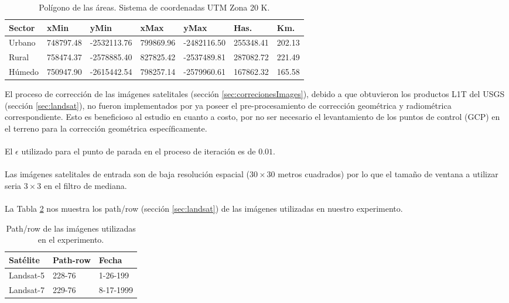 \begin{table}[H]
	\centering
	\begin{tabular}{|l|l|l|l|l|l|l|}
		\hline
		\rowcolor[HTML]{EFEFEF} 
		\textbf{Sector} & \textbf{xMin} & \textbf{yMin} & \textbf{xMax} & \textbf{yMax} & \textbf{Has.} & \textbf{Km.} \\ \hline
		Urbano          & 748797.48     & -2532113.76   & 799869.96     & -2482116.50 & 255348.41 & 202.13   \\ \hline
		Rural           & 758474.37     & -2578885.40   & 827825.42     & -2537489.81 & 287082.72 & 221.49  \\ \hline
		H\'umedo          & 750947.90     & -2615442.54   & 798257.14     & -2579960.61 & 167862.32 & 165.58	  \\ \hline
	\end{tabular}
		\caption{Pol\'igono de las \'areas. Sistema de coordenadas UTM Zona 20 K. }
		\label{t:poligonos}
\end{table}
El proceso de correcci\'on de las im\'agenes satelitales (secci\'on \ref{sec:correcionesImages}), debido a que obtuvieron los productos L1T del USGS (secci\'on \ref{sec:landsat}), no fueron implementados por ya poseer el pre-procesamiento de correcci\'on geom\'etrica y radiom\'etrica correspondiente. Esto es beneficioso al estudio en cuanto a costo, por no ser necesario el levantamiento de los puntos de control (GCP) en el terreno para la correcci\'on geom\'etrica espec\'ificamente.\\~\\
El $ \epsilon $ utilizado para el punto de parada en el proceso de iteraci\'on es de $ 0.01 $.\\~\\
Las im\'agenes satelitales de entrada son de baja resoluci\'on espacial ($ 30 \times 30 $ metros cuadrados) por lo que el tama\~{n}o de ventana a utilizar seria $ 3 \times 3 $ en el filtro de mediana. \\~\\
 La Tabla \ref{t:pathRow} nos muestra los path/row (secci\'on \ref{sec:landsat}) de las im\'agenes utilizadas en nuestro experimento.

\begin{table}[H]
	\centering

	\begin{tabular}{|l|l|l|}
		\hline
		\rowcolor[HTML]{EFEFEF} 
		\textbf{Sat\'elite} & \textbf{Path-row} & \textbf{Fecha}  \\ \hline
		Landsat-5         & 228-76            & 1-26-199       \\ \hline
		Landsat-7         & 229-76            & 8-17-1999      \\ \hline
	\end{tabular}
		\caption{Path/row de las im\'agenes utilizadas en el experimento.}
		\label{t:pathRow}
\end{table}

